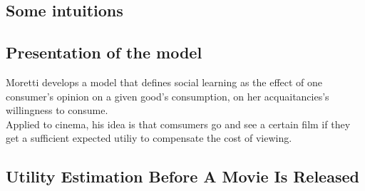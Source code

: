\subsection{Some intuitions}

\subsection{Presentation of the model}




Moretti develops a model that defines social learning as the effect of one consumer's opinion on a given good's consumption, on her acquaitancies's willingness to consume.\\
Applied to cinema, his idea is that comsumers go and see a certain film if they get a sufficient expected utiliy to compensate the cost of viewing.\\
\subsection{Utility Estimation Before A Movie Is Released}	
